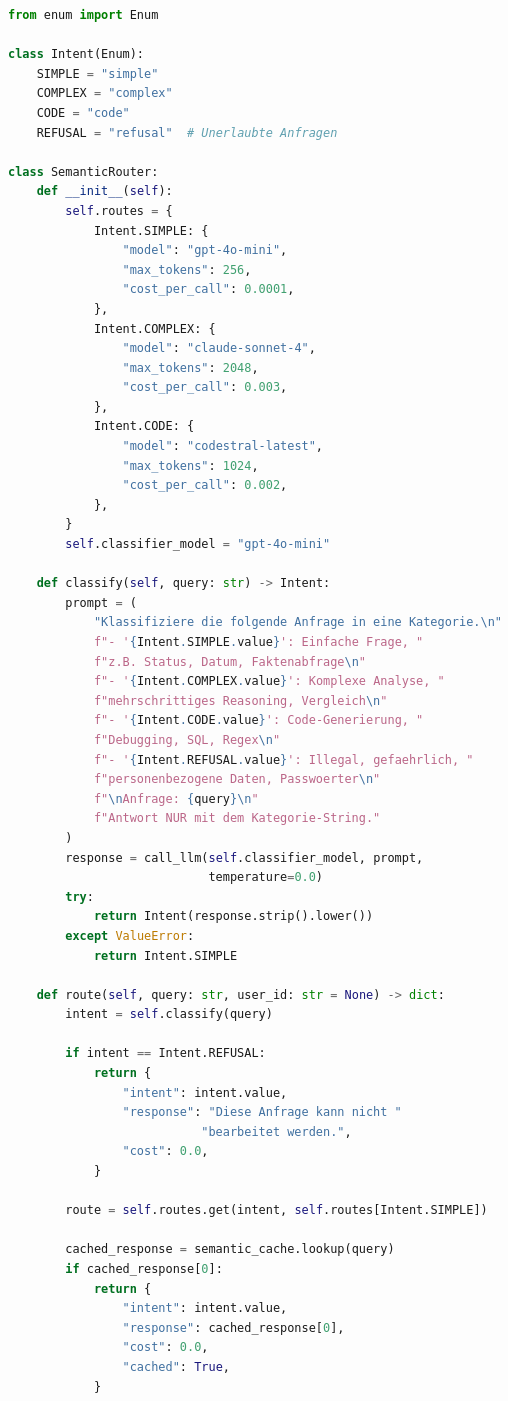 \begin{lstlisting}[language=Python, caption=Semantic Router mit Intent-Klassifikation]
from enum import Enum

class Intent(Enum):
    SIMPLE = "simple"
    COMPLEX = "complex"
    CODE = "code"
    REFUSAL = "refusal"  # Unerlaubte Anfragen

class SemanticRouter:
    def __init__(self):
        self.routes = {
            Intent.SIMPLE: {
                "model": "gpt-4o-mini",
                "max_tokens": 256,
                "cost_per_call": 0.0001,
            },
            Intent.COMPLEX: {
                "model": "claude-sonnet-4",
                "max_tokens": 2048,
                "cost_per_call": 0.003,
            },
            Intent.CODE: {
                "model": "codestral-latest",
                "max_tokens": 1024,
                "cost_per_call": 0.002,
            },
        }
        self.classifier_model = "gpt-4o-mini"

    def classify(self, query: str) -> Intent:
        prompt = (
            "Klassifiziere die folgende Anfrage in eine Kategorie.\n"
            f"- '{Intent.SIMPLE.value}': Einfache Frage, "
            f"z.B. Status, Datum, Faktenabfrage\n"
            f"- '{Intent.COMPLEX.value}': Komplexe Analyse, "
            f"mehrschrittiges Reasoning, Vergleich\n"
            f"- '{Intent.CODE.value}': Code-Generierung, "
            f"Debugging, SQL, Regex\n"
            f"- '{Intent.REFUSAL.value}': Illegal, gefaehrlich, "
            f"personenbezogene Daten, Passwoerter\n"
            f"\nAnfrage: {query}\n"
            f"Antwort NUR mit dem Kategorie-String."
        )
        response = call_llm(self.classifier_model, prompt,
                            temperature=0.0)
        try:
            return Intent(response.strip().lower())
        except ValueError:
            return Intent.SIMPLE

    def route(self, query: str, user_id: str = None) -> dict:
        intent = self.classify(query)

        if intent == Intent.REFUSAL:
            return {
                "intent": intent.value,
                "response": "Diese Anfrage kann nicht "
                           "bearbeitet werden.",
                "cost": 0.0,
            }

        route = self.routes.get(intent, self.routes[Intent.SIMPLE])

        cached_response = semantic_cache.lookup(query)
        if cached_response[0]:
            return {
                "intent": intent.value,
                "response": cached_response[0],
                "cost": 0.0,
                "cached": True,
            }


\end{lstlisting}
